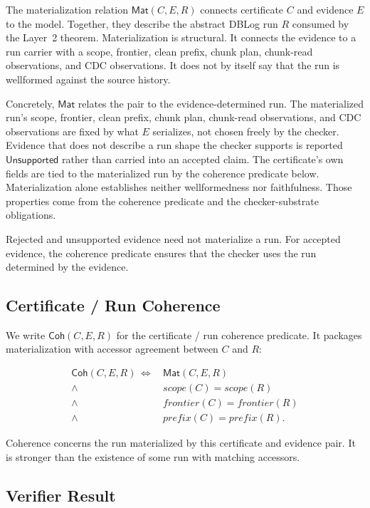 \documentclass[letterpaper,10pt,twocolumn]{article}
\newcommand{\Scope}{\mathit{scope}}
\newcommand{\Frontier}{\mathit{frontier}}
\newcommand{\CleanPrefix}{\mathit{prefix}}
\newcommand{\Mat}{\mathsf{Mat}}
\newcommand{\Coh}{\mathsf{Coh}}
\newcommand{\Unsupported}{\mathsf{Unsupported}}
\begin{document}
The materialization relation $\Mat(C,E,R)$ connects certificate $C$ and
evidence $E$ to the model. Together, they describe the abstract DBLog
run $R$ consumed by the Layer~2 theorem. Materialization is
structural. It connects
the evidence to a run carrier with a scope, frontier, clean prefix,
chunk plan, chunk-read observations, and CDC observations. It does
not by itself say that the run is wellformed against the source
history.

Concretely, $\Mat$ relates the pair to the evidence-determined run.
The materialized run's scope, frontier, clean prefix, chunk plan,
chunk-read observations, and CDC observations are fixed by what $E$
serializes, not chosen freely by the checker. Evidence that does not
describe a run shape the checker supports is reported $\Unsupported$
rather than carried into an accepted claim. The certificate's own
fields are tied to the materialized run by the coherence predicate
below. Materialization alone establishes neither wellformedness nor
faithfulness. Those properties come from the coherence predicate and
the checker-substrate obligations.

Rejected and unsupported evidence need not materialize a run. For
accepted evidence, the coherence predicate ensures that the checker
uses the run determined by the evidence.

\subsection{Certificate / Run
Coherence}\label{certificate-run-coherence}

We write $\Coh(C,E,R)$ for the certificate / run coherence predicate.
It packages materialization with accessor agreement between $C$ and
$R$:

\[
\begin{aligned}
\Coh(C,E,R) \,\Longleftrightarrow\,&
  \Mat(C,E,R)\\
  \land\,& \Scope(C)=\Scope(R)\\
  \land\,& \Frontier(C)=\Frontier(R)\\
  \land\,& \CleanPrefix(C)=\CleanPrefix(R).
\end{aligned}
\]

Coherence concerns the run materialized by this certificate and evidence
pair. It is stronger than the existence of some run with matching
accessors.

\subsection{Verifier Result}\label{verifier-result}
\end{document}
